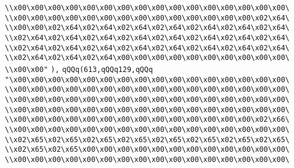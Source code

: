 \verb|\\x00\x00\x00\x00\x00\x00\x00\x00\x00\x00\x00\x00\x00\x00\x00\x00\|\newline
\verb|\\x00\x00\x00\x00\x00\x00\x00\x00\x00\x00\x00\x00\x00\x00\x02\x64\|\newline
\verb|\\x00\x00\x02\x64\x02\x64\x02\x64\x02\x64\x02\x64\x02\x64\x02\x64\|\newline
\verb|\\x02\x64\x02\x64\x02\x64\x02\x64\x02\x64\x02\x64\x02\x64\x02\x64\|\newline
\verb|\\x02\x64\x02\x64\x02\x64\x02\x64\x02\x64\x02\x64\x02\x64\x02\x64\|\newline
\verb|\\x02\x64\x02\x64\x02\x64\x00\x00\x00\x00\x00\x00\x00\x00\x00\x00\|\newline
\verb|\\x00\x00"|\newline
\verb|),|\newline
\verb|qQQq(613,qQQq129,qQQq|\newline
\verb|"\x00\x00\x00\x00\x00\x00\x00\x00\x00\x00\x00\x00\x00\x00\x00\x00\|\newline
\verb|\\x00\x00\x00\x00\x00\x00\x00\x00\x00\x00\x00\x00\x00\x00\x00\x00\|\newline
\verb|\\x00\x00\x00\x00\x00\x00\x00\x00\x00\x00\x00\x00\x00\x00\x00\x00\|\newline
\verb|\\x00\x00\x00\x00\x00\x00\x00\x00\x00\x00\x00\x00\x00\x00\x00\x00\|\newline
\verb|\\x00\x00\x00\x00\x00\x00\x00\x00\x00\x00\x00\x00\x00\x00\x02\x66\|\newline
\verb|\\x00\x00\x00\x00\x00\x00\x00\x00\x00\x00\x00\x00\x00\x00\x00\x00\|\newline
\verb|\\x02\x65\x02\x65\x02\x65\x02\x65\x02\x65\x02\x65\x02\x65\x02\x65\|\newline
\verb|\\x02\x65\x02\x65\x00\x00\x00\x00\x00\x00\x00\x00\x00\x00\x00\x00\|\newline
\verb|\\x00\x00\x00\x00\x00\x00\x00\x00\x00\x00\x00\x00\x00\x00\x00\x00\|\newline
